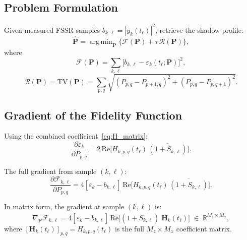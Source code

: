 \documentclass[11pt,a4paper]{article}
\newcommand{\R}{\mathbb{R}}
\newcommand{\TV}{\mathrm{TV}}
\DeclareMathOperator*{\argmin}{arg\,min}
\begin{document}
\subsection{Problem Formulation}

Given measured FSSR samples $b_{k,\ell}=|\tilde{y}_k(t_\ell)|^2$,
retrieve the shadow profile:
\begin{equation}
  \hat{\mathbf{P}} = \argmin_{\mathbf{P}}
  \bigl\{\mathcal{F}(\mathbf{P}) + \tau\,\mathcal{R}(\mathbf{P})\bigr\},
  \label{eq:zone_a_problem}
\end{equation}
where
\begin{equation}
  \mathcal{F}(\mathbf{P})
  = \sum_{k,\ell}
  \bigl[b_{k,\ell} - \varepsilon_k(t_\ell;\mathbf{P})\bigr]^2,
  \label{eq:fidelity}
\end{equation}
\begin{equation}
  \mathcal{R}(\mathbf{P}) = \TV(\mathbf{P})
  = \sum_{p,q}\sqrt{(P_{p,q}{-}P_{p+1,q})^2
  +(P_{p,q}{-}P_{p,q+1})^2}.
  \label{eq:tv_reg}
\end{equation}

\subsection{Gradient of the Fidelity Function}
\label{sec:gradient}

Using the combined coefficient~\eqref{eq:H_matrix}:
\begin{equation}
  \frac{\partial\varepsilon_k}{\partial P_{p,q}}
  = 2\,\mathrm{Re}\!\bigl[H_{k,p,q}(t_\ell)\,
  \overline{(1{+}S_{k,\ell})}\bigr].
  \label{eq:deps_dP}
\end{equation}

The full gradient from sample $(k,\ell)$:
\begin{equation}
  \boxed{
  \frac{\partial\mathcal{F}_{k,\ell}}{\partial P_{p,q}}
  = 4[\varepsilon_k{-}b_{k,\ell}]\,
  \mathrm{Re}\!\bigl[H_{k,p,q}(t_\ell)\,
  \overline{(1{+}S_{k,\ell})}\bigr].}
  \label{eq:grad_fidelity}
\end{equation}

In matrix form, the gradient at sample $(k,\ell)$ is:
\begin{equation}
  \nabla_{\mathbf{P}}\mathcal{F}_{k,\ell}
  = 4[\varepsilon_k{-}b_{k,\ell}]\,
  \mathrm{Re}\!\bigl[\overline{(1{+}S_{k,\ell})}\;
  \mathbf{H}_k(t_\ell)\bigr]
  \;\in\;\R^{M_z\times M_x},
  \label{eq:grad_matrix}
\end{equation}
where $[\mathbf{H}_k(t_\ell)]_{p,q}=H_{k,p,q}(t_\ell)$ is the full
$M_z\times M_x$ coefficient matrix.
\end{document}
